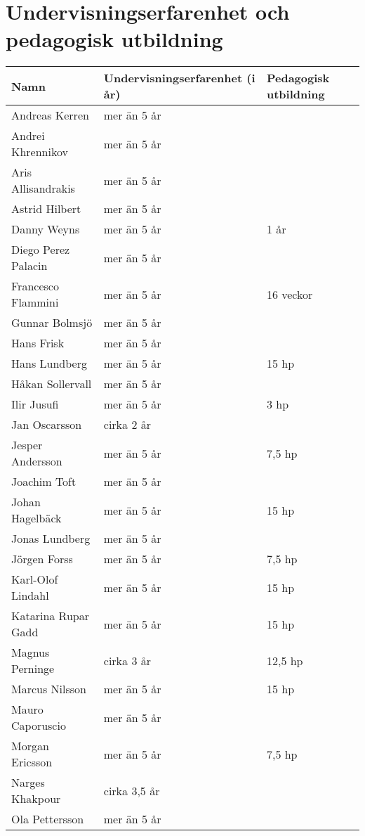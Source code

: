 \chapter{Undervisningserfarenhet och pedagogisk utbildning\label{app:kompetens}}

\begin{threeparttable}
\begin{longtable}[]{@{}lll@{}}
\toprule
\textsf{\textbf{Namn}}  & \textsf{\textbf{Undervisningserfarenhet (i år)}} & \textsf{\textbf{Pedagogisk utbildning}} \tabularnewline
\midrule
\endhead
Andreas Kerren               & mer än 5 år  &               \tabularnewline     
Andrei Khrennikov            & mer än 5 år  &               \tabularnewline     
Aris Allisandrakis           & mer än 5 år  &               \tabularnewline     
Astrid Hilbert\tnote{1}      & mer än 5 år  &               \tabularnewline     
Danny Weyns                  & mer än 5 år  & 1 år\tnote{3} \tabularnewline     
Diego Perez Palacin\tnote{2} & mer än 5 år  &               \tabularnewline     
Francesco Flammini           & mer än 5 år  & 16 veckor     \tabularnewline     
Gunnar Bolmsjö               & mer än 5 år  &               \tabularnewline     
Hans Frisk\tnote{1}          & mer än 5 år  &               \tabularnewline     
Hans Lundberg\tnote{1}       & mer än 5 år  & 15 hp         \tabularnewline     
Håkan Sollervall             & mer än 5 år  &               \tabularnewline     
Ilir Jusufi                  & mer än 5 år  & 3 hp          \tabularnewline     
Jan Oscarsson                & cirka 2 år   &               \tabularnewline      
Jesper Andersson\tnote{2}    & mer än 5 år  & 7,5 hp        \tabularnewline     
Joachim Toft                 & mer än 5 år  &               \tabularnewline     
Johan Hagelbäck              & mer än 5 år  & 15 hp         \tabularnewline     
Jonas Lundberg               & mer än 5 år  &               \tabularnewline     
Jörgen Forss\tnote{1}        & mer än 5 år  & 7,5 hp        \tabularnewline     
Karl-Olof Lindahl            & mer än 5 år  & 15 hp         \tabularnewline     
Katarina Rupar Gadd          & mer än 5 år  & 15 hp         \tabularnewline     
Magnus Perninge              & cirka 3 år   & 12,5 hp       \tabularnewline 
Marcus Nilsson               & mer än 5 år  & 15 hp         \tabularnewline     
Mauro Caporuscio             & mer än 5 år  &               \tabularnewline     
Morgan Ericsson\tnote{2}     & mer än 5 år  & 7,5 hp        \tabularnewline     
Narges Khakpour              & cirka 3,5 år &               \tabularnewline 
Ola Pettersson               & mer än 5 år  &               \tabularnewline     

\end{longtable}
\end{threeparttable}
